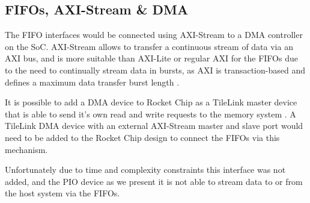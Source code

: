 \subsection{FIFOs, AXI-Stream \& DMA}

The FIFO interfaces would be connected using AXI-Stream to a DMA controller on the SoC. AXI-Stream allows to transfer a continuous stream of data via an AXI bus, and is more suitable than AXI-Lite or regular AXI for the FIFOs due to the need to continually stream data in bursts, as AXI is transaction-based and defines a maximum data transfer burst length \cite{axi_stream}.

It is possible to add a DMA device to Rocket Chip as a TileLink master device that is able to send it's own read and write requests to the memory system \cite{chipyard}. A TileLink DMA device with an external AXI-Stream master and slave port would need to be added to the Rocket Chip design to connect the FIFOs via this mechanism.

Unfortunately due to time and complexity constraints this interface was not added, and the PIO device as we present it is not able to stream data to or from the host system via the FIFOs.
